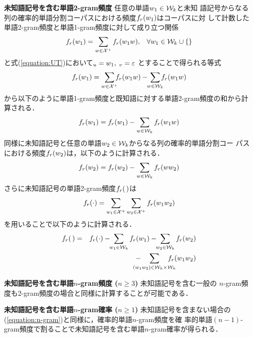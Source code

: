 \begin{list}{}{}
\item[\textbf{未知語記号を含む単語2-gram頻度}] 任意の単語$w_{1} \in {\cal W}_{k}$と未知
  語記号からなる列の確率的単語分割コーパスにおける頻度$f_{r}(w_{1}\UW)$はコーパスに対
  して計数した単語2-gram頻度と単語1-gram頻度に対して成り立つ関係
  \begin{displaymath}
    f_{r}(w_{1}) = \sum_{w \in {\cal X}^{+}} f_{r}(w_{1}w),
    \;\;\;\forall w_{1} \in {\cal W}_k\cup\{\UW\}
  \end{displaymath}
  と式(\ref{equation:UT})において$\Bdma{w}_{u} = w_{1},\;\Bdma{w}_{v} = \varepsilon$ 
  とすることで得られる等式
  \begin{displaymath}
    f_{r}(w_{1}\UW) = \sum_{w \in {\cal X}^{+}} \!\!\! f_{r}(w_{1}w)
    - \!\! \sum_{w \in {\cal W}_{k}} \!\!\! f_{r}(w_{1}w)
  \end{displaymath}
  から以下のように単語1-gram頻度と既知語に対する単語2-gram頻度の和から計算される．
  \begin{displaymath}
    f_{r}(w_{1}\UW) = f_{r}(w_{1}) - \sum_{w \in
      {\cal W}_{k}}f_{r}(w_{1}w)
  \end{displaymath}
  同様に未知語記号と任意の単語$w_{2} \in {\cal W}_{k}$からなる列の確率的単語分割コー
  パスにおける頻度$f_{r}(\UW w_{2})$は，以下のように計算される．
  \begin{displaymath}
    f_{r}(\UW w_{2}) = f_{r}(w_{2}) - \sum_{w \in
      {\cal W}_{k}}f_{r}(ww_{2})
  \end{displaymath}
  さらに未知語記号の単語2-gram頻度$f_{r}(\UW\,\UW)$は
  \begin{displaymath}
    f_{r}(\cdot)
    = \sum_{w_{1} \in {\cal X}^{+}} \sum_{w_{2} \in {\cal X}^{+}} f_{r}(w_{1}w_{2})
  \end{displaymath}
  を用いることで以下のように計算される．
  \begin{eqnarray*}
    f_{r}(\UW\,\UW)
    & = & f_{r}(\cdot) - \!\! \sum_{w_{1} \in {\cal W}_{k}} f_{r}(w_{1}\UW)
                       - \!\! \sum_{w_{2} \in {\cal W}_{k}} f_{r}(\UW w_{2}) \\
    &   &
        - \!\!\!\!\!\!\!\! \sum_{(w_{1}w_{2}) \in {\cal W}_{k}\times{\cal W}_{k}}
          \!\!\!\!\!\!\!\! f_{r}(w_{1}w_{2})
  \end{eqnarray*}

\item[\textbf{未知語記号を含む単語$n$-gram頻度 ($n \geq 3$)}] 未知語記号を含む一般の
  $n$-gram頻度も2-gram頻度の場合と同様に計算することが可能である．

\item[\textbf{未知語記号を含む単語$n$-gram確率 ($n \geq 1$)}] 未知語記号を含まない場合の
  (\ref{equation:n-gram})と同様に，確率的単語$n$-gram頻度を確
  率的単語$(n-1)$-gram頻度で割ることで未知語記号を含む単語$n$-gram確率が得られる．

\end{list}{}{}

